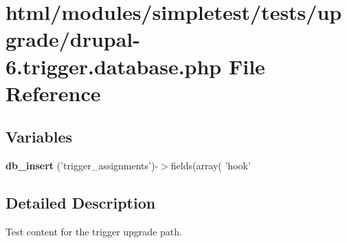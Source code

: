 \hypertarget{drupal-6_8trigger_8database_8php}{
\section{html/modules/simpletest/tests/upgrade/drupal-\/6.trigger.database.php File Reference}
\label{drupal-6_8trigger_8database_8php}
}
\subsection*{Variables}
\begin{DoxyCompactItemize}
\item 
\hypertarget{drupal-6_8trigger_8database_8php_abc15cfeba2594222f135ca8ce07b39f6}{
{\bfseries db\_\-insert} ('trigger\_\-assignments')-\/$>$fields(array( 'hook'}
\label{drupal-6_8trigger_8database_8php_abc15cfeba2594222f135ca8ce07b39f6}

\end{DoxyCompactItemize}


\subsection{Detailed Description}
Test content for the trigger upgrade path. 